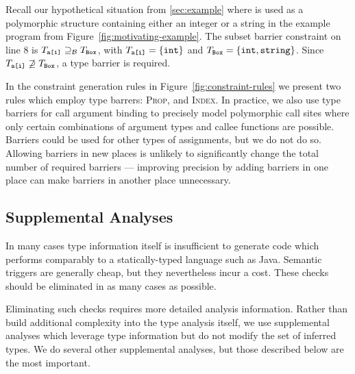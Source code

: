 Recall our hypothetical situation from \Section\ref{sec:example} where  is
used as a polymorphic structure containing either an integer or a string in
the example program from Figure~\ref{fig:motivating-example}. The subset
barrier constraint on line 8 is $T_{\texttt{a[i]}} \supseteq_\mathcal{B} T_{\texttt{Box}}$,
with $T_{\texttt{a[i]}} = \{\texttt{int}\}$ and $T_{\texttt{Box}} = \{\texttt{int},
\texttt{string}\}$. Since $T_{\texttt{a[i]}} \not\supseteq T_{\texttt{Box}}$, a type
barrier is required.

In the constraint generation rules in Figure~\ref{fig:constraint-rules} we
present two rules which employ type barrers:
\textsc{Prop}, and \textsc{Index}. In practice, we also use type barriers for
call argument binding to precisely model polymorphic call sites where
only certain combinations of argument types and callee functions are possible.
Barriers could be used for other types of assignments, but we do not do so.
Allowing barriers in new places is unlikely to significantly change the total
number of required barriers --- improving precision by adding barriers in one
place can make barriers in another place unnecessary.

\subsection{Supplemental Analyses}
\label{sec:supplemental-analyses}

In many cases type information itself is insufficient to generate code
which performs comparably to a statically-typed language such as Java.
Semantic triggers are generally cheap, but they nevertheless incur a cost.
These checks should be eliminated in as many cases as possible.

Eliminating such checks requires more detailed analysis information.
Rather than build additional complexity into the type analysis itself,
we use supplemental analyses which leverage type information but do not
modify the set of inferred types.
We do several other supplemental analyses, but those described below are the most important.

